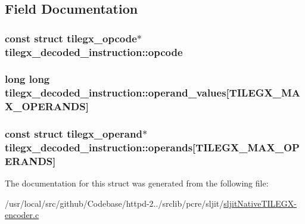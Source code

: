 \subsection{Field Documentation}
\subsubsection[{\texorpdfstring{opcode}{opcode}}]{\setlength{\rightskip}{0pt plus 5cm}const struct {\bf tilegx\+\_\+opcode}$\ast$ tilegx\+\_\+decoded\+\_\+instruction\+::opcode}\hypertarget{structtilegx__decoded__instruction_a28eaaa8cf2f9ac76bda38bda76cea24f}{}\label{structtilegx__decoded__instruction_a28eaaa8cf2f9ac76bda38bda76cea24f}
\subsubsection[{\texorpdfstring{operand\+\_\+values}{operand_values}}]{\setlength{\rightskip}{0pt plus 5cm}long long tilegx\+\_\+decoded\+\_\+instruction\+::operand\+\_\+values\mbox{[}{\bf T\+I\+L\+E\+G\+X\+\_\+\+M\+A\+X\+\_\+\+O\+P\+E\+R\+A\+N\+DS}\mbox{]}}\hypertarget{structtilegx__decoded__instruction_aeeea6dd405b6d3370ac804b2ef4a0c44}{}\label{structtilegx__decoded__instruction_aeeea6dd405b6d3370ac804b2ef4a0c44}
\subsubsection[{\texorpdfstring{operands}{operands}}]{\setlength{\rightskip}{0pt plus 5cm}const struct {\bf tilegx\+\_\+operand}$\ast$ tilegx\+\_\+decoded\+\_\+instruction\+::operands\mbox{[}{\bf T\+I\+L\+E\+G\+X\+\_\+\+M\+A\+X\+\_\+\+O\+P\+E\+R\+A\+N\+DS}\mbox{]}}\hypertarget{structtilegx__decoded__instruction_a6685678267fe496c9ee0df0c5319101d}{}\label{structtilegx__decoded__instruction_a6685678267fe496c9ee0df0c5319101d}


The documentation for this struct was generated from the following file\+:\begin{DoxyCompactItemize}
\item 
/usr/local/src/github/\+Codebase/httpd-\/2../srclib/pcre/sljit/\hyperlink{sljitNativeTILEGX-encoder_8c}{sljit\+Native\+T\+I\+L\+E\+G\+X-\/encoder.\+c}\end{DoxyCompactItemize}
